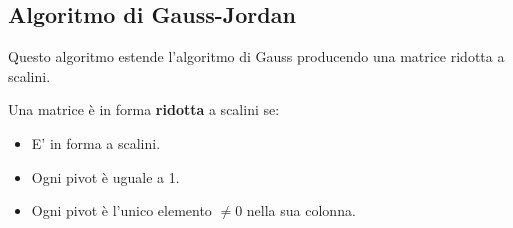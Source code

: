 \subsection{Algoritmo di Gauss-Jordan}
Questo algoritmo estende l'algoritmo di Gauss producendo una matrice ridotta a scalini.
\begin{definition}
Una matrice è in forma \textbf{ridotta} a scalini se:
\begin{itemize}
    \item E' in forma a scalini.
    \item Ogni pivot è uguale a 1.
    \item Ogni pivot è l'unico elemento $\neq 0$ nella sua colonna.
\end{itemize}
\end{definition}

